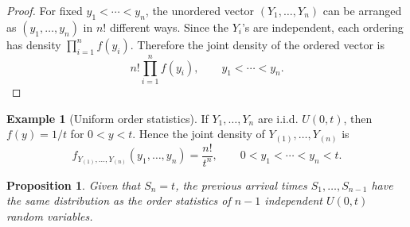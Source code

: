 \documentclass[11pt]{article}
\theoremstyle{plain}
\newtheorem{proposition}[theorem]{Proposition}
\theoremstyle{definition}
\newtheorem{example}[theorem]{Example}
\theoremstyle{remark}
\begin{document}
	\begin{proof}
		For fixed \(y_1<\cdots<y_n\), the unordered vector \((Y_1,\dots,Y_n)\) can be arranged as \((y_1,\dots,y_n)\) in \(n!\) different ways. Since the \(Y_i\)'s are independent, each ordering has density \(\prod_{i=1}^{n}f(y_i)\). Therefore the joint density of the ordered vector is
		\[
		n!\prod_{i=1}^{n}f(y_i),
		\qquad y_1<\cdots<y_n.
		\]
	\end{proof}
	
	\begin{example}[Uniform order statistics]
		If \(Y_1,\dots,Y_n\) are i.i.d. \(U(0,t)\), then \(f(y)=1/t\) for \(0<y<t\). Hence the joint density of \(Y_{(1)},\dots,Y_{(n)}\) is
		\[
		f_{Y_{(1)},\dots,Y_{(n)}}(y_1,\dots,y_n)
		=
		\frac{n!}{t^n},
		\qquad 0<y_1<\cdots<y_n<t.
		\]
	\end{example}
	
\begin{proposition}
	Given that \(S_n=t\), the previous arrival times \(S_1,\dots,S_{n-1}\) have the same distribution as the order statistics of \(n-1\) independent \(U(0,t)\) random variables.
\end{proposition}
\end{document}
